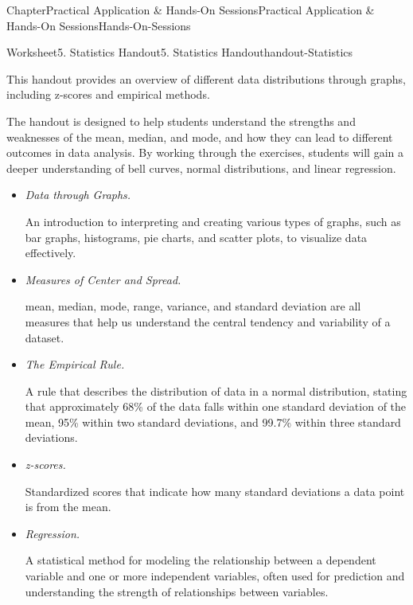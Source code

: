 \documentclass[oneside,10pt,]{book}
\newcommand{\ptxlistdisc}{\raisebox{0.3ex}{\textbullet}}
\newcommand{\lititle}[1]{{\slshape#1}}
\begin{document}
\begin{chapterptx}{Chapter}{Practical Application \& Hands-On Sessions}{}{Practical Application \& Hands-On Sessions}{}{}{Hands-On-Sessions}
%
%
\typeout{************************************************}
\typeout{************************************************}
%
\begin{worksheet-section}{Worksheet}{5. Statistics Handout}{}{5. Statistics Handout}{}{}{handout-Statistics}
\begin{introduction}{}%
This handout provides an overview of different data distributions through graphs, including z-scores and empirical methods.%
\par
The handout is designed to help students understand the strengths and weaknesses of the mean, median, and mode, and how they can lead to different outcomes in data analysis. By working through the exercises, students will gain a deeper understanding of bell curves, normal distributions, and linear regression.%
\par
%
\begin{itemize}[label=\ptxlistdisc]
\item{}\lititle{Data through Graphs.}\par%
 An introduction to interpreting and creating various types of graphs, such as bar graphs, histograms, pie charts, and scatter plots, to visualize data effectively.%
\item{}\lititle{Measures of Center and Spread.}\par%
 mean, median, mode, range, variance, and standard deviation are all measures that help us understand the central tendency and variability of a dataset.%
\item{}\lititle{The Empirical Rule.}\par%
 A rule that describes the distribution of data in a normal distribution, stating that approximately 68\% of the data falls within one standard deviation of the mean, 95\% within two standard deviations, and 99.7\% within three standard deviations.%
\item{}\lititle{z-scores.}\par%
 Standardized scores that indicate how many standard deviations a data point is from the mean.%
\item{}\lititle{Regression.}\par%
 A statistical method for modeling the relationship between a dependent variable and one or more independent variables, often used for prediction and understanding the strength of relationships between variables.%
\end{itemize}
%
\end{introduction}%

\end{worksheet-section}
\end{chapterptx}
\end{document}

